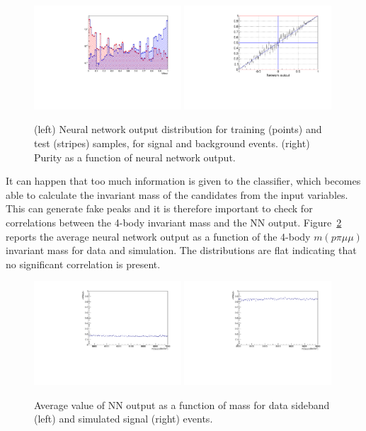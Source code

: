 \begin{figure}
\centering
\includegraphics[width=0.49\textwidth]{Lmumu/figs/TrainAndTest.pdf}
\includegraphics[width=0.49\textwidth]{Lmumu/figs/purity_NN.pdf}
\caption{(left) Neural network output distribution for training (points) and test (stripes) samples,
for signal and background events. (right) Purity as a function of neural network output.}
\label{fig:Lb_nnDist}
\end{figure}
%
It can happen that too much information is given to the classifier, which becomes able to 
calculate the invariant mass of the candidates from the input variables.
This can generate fake peaks and it is therefore important to check
for correlations between the 4-body invariant mass and the NN output.
Figure~\ref{fig:Lb_NNprofiles} reports the average neural network output as a function of
the 4-body $m(p\pi\mu\mu)$ invariant mass for data and simulation. The distributions
are flat indicating that no significant correlation is present.
%
\begin{figure}
\centering
\includegraphics[width=0.49\textwidth]{Lmumu/figs/NNout_profile_vs_LbMM_bkgData.pdf}
\includegraphics[width=0.49\textwidth]{Lmumu/figs/NNout_profile_vs_LbMM_MCsignal.pdf}
\caption{Average value of NN output as a function of \Lb mass for data sideband (left) and simulated signal (right) events.}
\label{fig:Lb_NNprofiles}
\end{figure}
